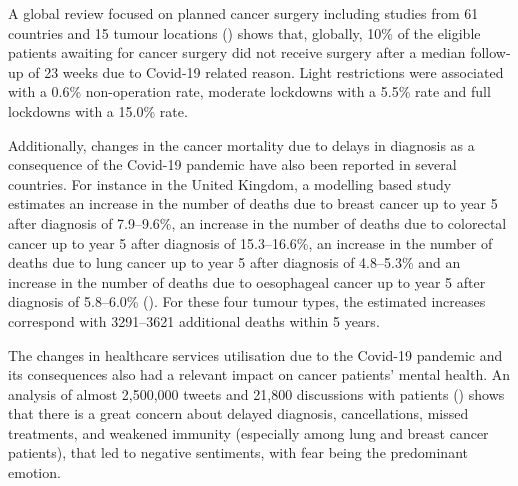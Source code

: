 \documentclass[main.tex]{subfiles}
\begin{document}
A global review focused on planned cancer surgery including studies from 61 countries and 15 tumour locations (\cite{covidsurg_collaborative_effect_2021}) shows that, globally, 10\% of the eligible patients awaiting for cancer surgery did not receive surgery after a median follow-up of 23 weeks due to Covid-19 related reason. Light restrictions were associated with a 0.6\% non-operation rate, moderate lockdowns with a 5.5\% rate and full lockdowns with a 15.0\% rate.

Additionally, changes in the cancer mortality due to delays in diagnosis as a consequence of the Covid-19 pandemic have also been reported in several countries. For instance in the United Kingdom, a modelling based study estimates an increase in the number of deaths due to breast cancer up to year 5 after diagnosis of 7.9–9.6\%, an increase in the number of deaths due to colorectal cancer up to year 5 after diagnosis of 15.3–16.6\%, an increase in the number of deaths due to lung cancer up to year 5 after diagnosis of 4.8–5.3\% and an increase in the number of deaths due to oesophageal cancer up to year 5 after diagnosis of 5.8–6.0\% (\cite{maringe_impact_2020}). For these four tumour types, the estimated increases correspond with 3291–3621 additional deaths within 5 years.

The changes in healthcare services utilisation due to the Covid-19 pandemic and its consequences also had a relevant impact on cancer patients' mental health. An analysis of almost 2,500,000 tweets and 21,800 discussions with patients (\cite{moraliyage_cancer_2021}) shows that there is a great concern about delayed diagnosis, cancellations, missed treatments, and weakened immunity (especially among lung and breast cancer patients), that led to negative sentiments, with fear being the predominant emotion. 
\end{document}
